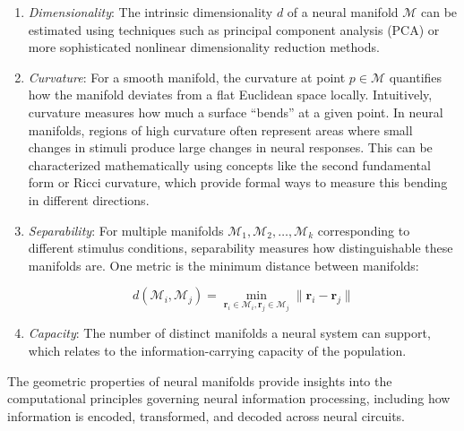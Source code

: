 \documentclass[11pt,a4paper]{article}
\begin{document}
\begin{enumerate}
    \item \textit{Dimensionality}: The intrinsic dimensionality $d$ of a neural manifold $\mathcal{M}$ can be estimated using techniques such as principal component analysis (PCA) or more sophisticated nonlinear dimensionality reduction methods.
    
    \item \textit{Curvature}: For a smooth manifold, the curvature at point $p \in \mathcal{M}$ quantifies how the manifold deviates from a flat Euclidean space locally. Intuitively, curvature measures how much a surface ``bends'' at a given point. In neural manifolds, regions of high curvature often represent areas where small changes in stimuli produce large changes in neural responses. This can be characterized mathematically using concepts like the second fundamental form or Ricci curvature, which provide formal ways to measure this bending in different directions.
    
    \item \textit{Separability}: For multiple manifolds $\mathcal{M}_1, \mathcal{M}_2, \ldots, \mathcal{M}_k$ corresponding to different stimulus conditions, separability measures how distinguishable these manifolds are. One metric is the minimum distance between manifolds:
    
    \begin{equation}
    d(\mathcal{M}_i, \mathcal{M}_j) = \min_{\mathbf{r}_i \in \mathcal{M}_i, \mathbf{r}_j \in \mathcal{M}_j} \|\mathbf{r}_i - \mathbf{r}_j\|
    \end{equation}
    
    \item \textit{Capacity}: The number of distinct manifolds a neural system can support, which relates to the information-carrying capacity of the population.
\end{enumerate}

The geometric properties of neural manifolds provide insights into the computational principles governing neural information processing, including how information is encoded, transformed, and decoded across neural circuits.
\end{document}
